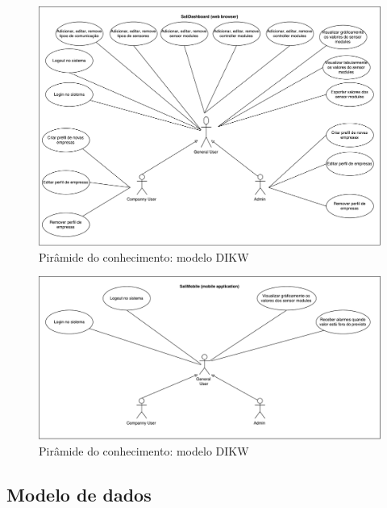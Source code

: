 \begin{figure}[!htb]
	\centering
	\includegraphics[width=\linewidth]{esquemas/use-case-web.pdf}
	\caption{Pirâmide do conhecimento: modelo DIKW}
	\label{dikw}
\end{figure}


\begin{figure}[!htb]
	\centering
	\includegraphics[width=\linewidth]{esquemas/use-case-mobile.pdf}
	\caption{Pirâmide do conhecimento: modelo DIKW}
	\label{dikw}
\end{figure}



\newpage
\subsection{Modelo de dados}


